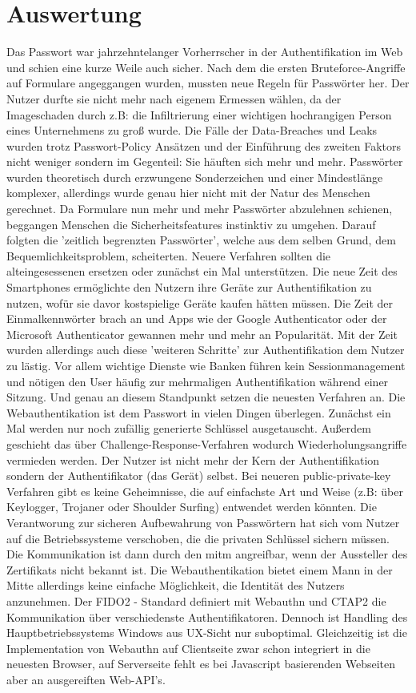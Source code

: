 \chapter{Auswertung}
Das Passwort war jahrzehntelanger Vorherrscher in der Authentifikation im Web und schien eine kurze Weile auch sicher. Nach dem die ersten Bruteforce-Angriffe auf Formulare angeggangen wurden, mussten neue Regeln für Passwörter her. Der Nutzer durfte sie nicht mehr nach eigenem Ermessen wählen, da der Imageschaden durch z.B: die Infiltrierung einer wichtigen hochrangigen Person eines Unternehmens zu groß wurde. Die Fälle der Data-Breaches und Leaks wurden trotz Passwort-Policy Ansätzen und der Einführung des zweiten Faktors nicht weniger sondern im Gegenteil: Sie häuften sich mehr und mehr. Passwörter wurden theoretisch durch erzwungene Sonderzeichen und einer Mindestlänge komplexer, allerdings wurde genau hier nicht mit der Natur des Menschen gerechnet. Da Formulare nun mehr und mehr Passwörter abzulehnen schienen, beggangen Menschen die Sicherheitsfeatures instinktiv zu umgehen. Darauf folgten die 'zeitlich begrenzten Passwörter', welche aus dem selben Grund, dem Bequemlichkeitsproblem, scheiterten. Neuere Verfahren sollten die alteingesessenen ersetzen oder zunächst ein Mal unterstützen. Die neue Zeit des Smartphones ermöglichte den Nutzern ihre Geräte zur Authentifikation zu nutzen, wofür sie davor kostspielige Geräte kaufen hätten müssen. Die Zeit der Einmalkennwörter brach an und Apps wie der Google Authenticator oder der Microsoft Authenticator gewannen mehr und mehr an Popularität. Mit der Zeit wurden allerdings auch diese 'weiteren Schritte' zur Authentifikation dem Nutzer zu lästig. Vor allem wichtige Dienste wie Banken führen kein Sessionmanagement und nötigen den User häufig zur mehrmaligen Authentifikation während einer Sitzung. Und genau an diesem Standpunkt setzen die neuesten Verfahren an. Die Webauthentikation ist dem Passwort in vielen Dingen überlegen. Zunächst ein Mal werden nur noch zufällig generierte Schlüssel ausgetauscht. Außerdem geschieht das über Challenge-Response-Verfahren wodurch Wiederholungsangriffe vermieden werden. Der Nutzer ist nicht mehr der Kern der Authentifikation sondern der Authentifikator (das Gerät) selbst. Bei neueren public-private-key Verfahren gibt es keine Geheimnisse, die auf einfachste Art und Weise (z.B: über Keylogger, Trojaner oder Shoulder Surfing) entwendet werden könnten. Die Verantworung zur sicheren Aufbewahrung von Passwörtern hat sich vom Nutzer auf die Betriebssysteme verschoben, die die privaten Schlüssel sichern müssen. Die Kommunikation ist dann durch den \ac{mitm} angreifbar, wenn der Aussteller des Zertifikats nicht bekannt ist. Die Webauthentikation bietet einem Mann in der Mitte allerdings keine einfache Möglichkeit, die Identität des Nutzers anzunehmen. Der FIDO2 - Standard definiert mit Webauthn und CTAP2 die Kommunikation über verschiedenste Authentifikatoren. Dennoch ist Handling des Hauptbetriebssystems Windows aus UX-Sicht nur suboptimal. Gleichzeitig ist die Implementation von Webauthn auf Clientseite zwar schon integriert in die neuesten Browser, auf Serverseite fehlt es bei Javascript basierenden Webseiten aber an ausgereiften Web-API's. 